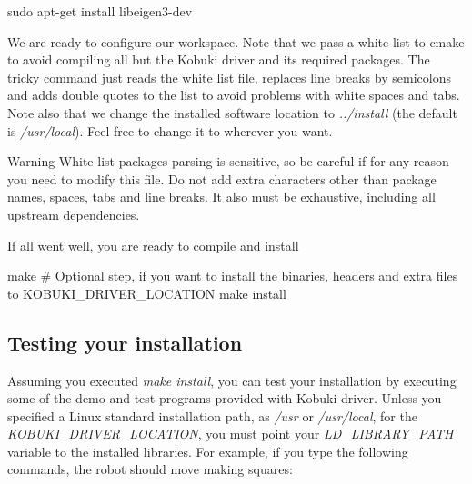\begin{DoxyCode}
  sudo apt-get install libeigen3-dev 
\end{DoxyCode}


\-We are ready to configure our workspace. \-Note that we pass a white list to cmake to avoid compiling all but the \-Kobuki driver and its required packages. \-The tricky command just reads the white list file, replaces line breaks by semicolons and adds double quotes to the list to avoid problems with white spaces and tabs. \-Note also that we change the installed software location to {\itshape ../install\/} (the default is {\itshape /usr/local\/}). \-Feel free to change it to wherever you want.

\begin{DoxyWarning}{\-Warning}
\-White list packages parsing is sensitive, so be careful if for any reason you need to modify this file. \-Do not add extra characters other than package names, spaces, tabs and line breaks. \-It also must be exhaustive, including all upstream dependencies.
\end{DoxyWarning}



\-If all went well, you are ready to compile and install


\begin{DoxyCode}
  make
  # Optional step, if you want to install the binaries, headers and extra files
       to KOBUKI_DRIVER_LOCATION
  make install 
\end{DoxyCode}
\subsection{\-Testing your installation}\label{enInstallationLinuxGuide_test}
\-Assuming you executed {\itshape make install\/}, you can test your installation by executing some of the demo and test programs provided with \-Kobuki driver. \-Unless you specified a \-Linux standard installation path, as {\itshape /usr\/} or {\itshape /usr/local\/}, for the {\itshape \-K\-O\-B\-U\-K\-I\-\_\-\-D\-R\-I\-V\-E\-R\-\_\-\-L\-O\-C\-A\-T\-I\-O\-N\/}, you must point your {\itshape \-L\-D\-\_\-\-L\-I\-B\-R\-A\-R\-Y\-\_\-\-P\-A\-T\-H\/} variable to the installed libraries. \-For example, if you type the following commands, the robot should move making squares\-:


